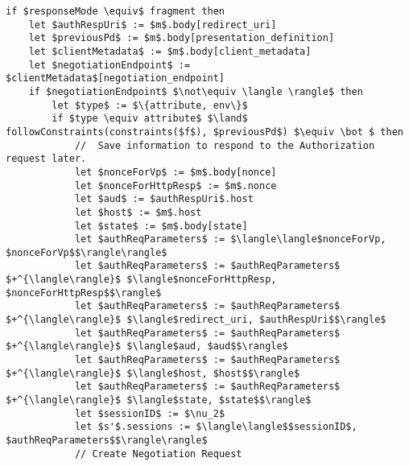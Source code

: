 


\begin{lstlisting}[language=pseudo, caption={Modificação na relação de um Fiduciário $R^{fid}$: Processamento de Requisições HTTPS}, firstnumber=70, label={lst:fid-relation}]
if $responseMode \equiv$ fragment then
    let $authRespUri$ := $m$.body[redirect_uri]
    let $previousPd$ := $m$.body[presentation_definition] 
    let $clientMetadata$ := $m$.body[client_metadata]
    let $negotiationEndpoint$ := $clientMetadata$[negotiation_endpoint]
    if $negotiationEndpoint$ $\not\equiv \langle \rangle$ then
        let $type$ := $\{attribute, env\}$
        if $type \equiv attribute$ $\land$ followConstraints(constraints($f$), $previousPd$) $\equiv \bot $ then
            //  Save information to respond to the Authorization request later.
            let $nonceForVp$ := $m$.body[nonce]
            let $nonceForHttpResp$ := $m$.nonce
            let $aud$ := $authRespUri$.host
            let $host$ := $m$.host
            let $state$ := $m$.body[state]
            let $authReqParameters$ := $\langle\langle$nonceForVp, $nonceForVp$$\rangle\rangle$
            let $authReqParameters$ := $authReqParameters$ $+^{\langle\rangle}$ $\langle$nonceForHttpResp, $nonceForHttpResp$$\rangle$
            let $authReqParameters$ := $authReqParameters$ $+^{\langle\rangle}$ $\langle$redirect_uri, $authRespUri$$\rangle$
            let $authReqParameters$ := $authReqParameters$ $+^{\langle\rangle}$ $\langle$aud, $aud$$\rangle$
            let $authReqParameters$ := $authReqParameters$ $+^{\langle\rangle}$ $\langle$host, $host$$\rangle$
            let $authReqParameters$ := $authReqParameters$ $+^{\langle\rangle}$ $\langle$state, $state$$\rangle$
            let $sessionID$ := $\nu_2$
            let $s'$.sessions := $\langle\langle$$sessionID$, $authReqParameters$$\rangle\rangle$
            // Create Negotiation Request

\end{lstlisting}
